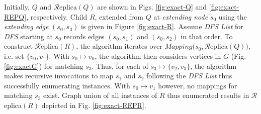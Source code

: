\begin{exple}
Initially, $Q$ and $\mathcal{R}$eplica$(Q)$ are shown in Figs. \ref{fig:exact-Q}
and \ref{fig:exact-REPQ}, respectively. Child $R$, extended from $Q$ at
\emph{extending node} $s_0$ using the \emph{extending edge} $(s_0, s_3)$ is
given in Figure \ref{fig:exact-R}. Assume \emph{DFS List} for \emph{DFS}
starting at $s_0$ records edges $(s_0, s_1)$ and $(s_0, s_2)$ in that order. To
construct $\mathcal{R}$eplica$(R)$, the algorithm iterates over
$Mapping(s_0,\mathcal{R}$eplica$(Q))$, i.e. set $\{v_0, v_1\}$. With $s_0\mapsto
v_0$, the algorithm then considers vertices in $G$ (Fig. \ref{fig:exactG}) for
matching $s_3$. Thus, for each of $s_3\mapsto \{v_2, v_3\}$, the algorithm makes
recursive invocations to map $s_1$ and $s_2$ following the \emph{DFS List}
thus successfully enumerating instances. With $s_0\mapsto v_1$ however, no
mappings for matching $s_3$ exist. Graph union of all instances of $R$ thus
enumerated results in $\mathcal{R}$eplica$(R)$ depicted in Fig. \ref{fig:exact-REPR}.
%
\end{exple}